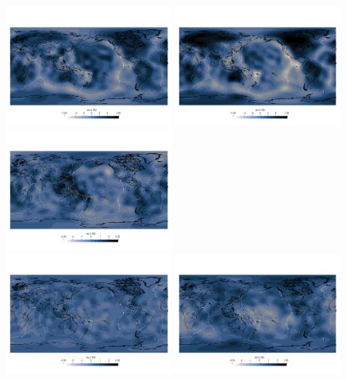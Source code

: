 \begin{center}
\includegraphics[width=5.5cm]{python_codes/fieldstone_85/images/fieldstone/fieldstone_S20RTS_25km.png}
\includegraphics[width=5.5cm]{python_codes/fieldstone_85/images/fieldstone/fieldstone_S20RTS_100km.png}
\includegraphics[width=5.5cm]{python_codes/fieldstone_85/images/fieldstone/fieldstone_S20RTS_600km.png}\\
\includegraphics[width=5.5cm]{python_codes/fieldstone_85/images/fieldstone/fieldstone_S20RTS_1500km.png}
\includegraphics[width=5.5cm]{python_codes/fieldstone_85/images/fieldstone/fieldstone_S20RTS_2800km.png}

\end{center}
